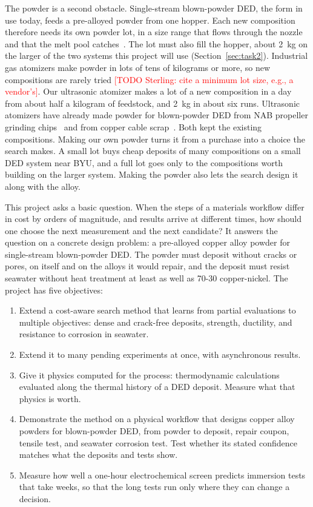 \documentclass[12pt,letterpaper]{article}
\newcommand{\todo}[1]{\textcolor{red}{[TODO Sterling: #1]}}
\begin{document}
The powder is a second obstacle. Single-stream blown-powder DED, the form in
use today, feeds a pre-alloyed powder from one hopper.
Each new composition therefore needs its own powder lot, in a size range that flows through the nozzle and that the melt pool catches~\cite{ancalmo2025,singh2020}.
The lot must also
fill the hopper, about 2~kg on the larger of the two systems this project
will use (Section~\ref{sec:task2}).
Industrial gas atomizers make powder in lots of tens of kilograms or more, so
new compositions are rarely tried \todo{cite a minimum lot size, e.g., a
vendor's}. Our ultrasonic atomizer makes a lot of a new composition in a day
from about half a kilogram of feedstock, and 2~kg in about six runs. Ultrasonic
atomizers have already made powder for blown-powder DED from NAB
propeller grinding chips~\cite{muller2023,uhlmann2024} and from copper cable
scrap~\cite{cabrioli2025}.
Both kept the existing compositions.
Making our own powder turns it from a purchase into a choice the search makes.
A small lot buys cheap deposits of many compositions on a small DED system near BYU, and a full lot goes only to the compositions worth building on the larger system.
Making the powder also lets the search design it along with the alloy.

This project asks a basic question. When the steps of a materials workflow
differ in cost by orders of magnitude, and results arrive at different times,
how should one choose the next measurement and the next candidate? It answers
the question on a concrete design problem: a
pre-alloyed copper alloy powder for single-stream blown-powder DED. The
powder must deposit without cracks or pores, on itself and on the alloys it
would repair, and the deposit must resist seawater without heat treatment at
least as well as 70-30 copper-nickel.
The project has five objectives:
\begin{enumerate}\setlength{\itemsep}{0pt}
\item Extend a cost-aware search method that learns from partial
evaluations to multiple objectives: dense and crack-free deposits, strength,
ductility, and resistance to corrosion in seawater.
\item Extend it to many pending experiments at once, with asynchronous
results.
\item Give it physics computed for the process: thermodynamic calculations
evaluated along the thermal history of a DED deposit. Measure what that
physics is worth.
\item Demonstrate the method on a physical workflow that designs copper alloy
powders for blown-powder DED, from powder to deposit, repair coupon, tensile
test, and seawater corrosion test.
Test whether its stated confidence matches what the deposits and tests show.
\item Measure how well a one-hour electrochemical screen predicts immersion
tests that take weeks, so that the long tests run only where they can change
a decision.
\end{enumerate}
\end{document}
